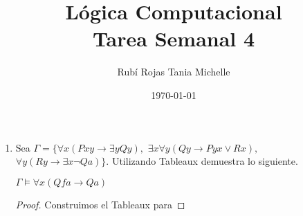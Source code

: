 \documentclass[letterpaper,11pt]{article}
\title{Lógica Computacional \\ Tarea Semanal 4}
\author{Rubí Rojas Tania Michelle}
\date{\today}
\begin{document}
\maketitle

\begin{enumerate}
    \item Sea $\Gamma = \{\forall x(P xy \rightarrow \exists y Qy), $
    $\exists x \forall y(Qy \rightarrow Pyx \lor Rx), $
    $\forall y(Ry \rightarrow \exists x \neg Qa)\}$.
    Utilizando Tableaux demuestra lo siguiente.
    \begin{center}
        $\Gamma \models \forall x (Qfa \rightarrow Qa)$
    \end{center}

    \begin{proof}
        Construimos el Tableaux para 

    \end{proof}
\end{enumerate}
    
\end{document}
